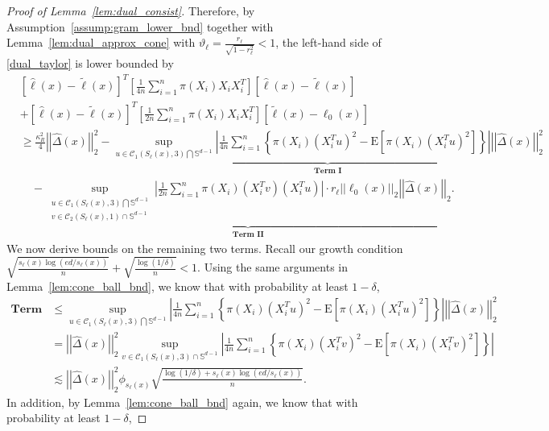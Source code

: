 \documentclass[ejsv2,noshowframe]{imsart}
\theoremstyle{plain}
\theoremstyle{definition}
\theoremstyle{remark}
\newcommand{\norm}[1]{\left|\left| #1 \right|\right|}
\renewcommand{\hat}{\widehat}
\renewcommand{\tilde}{\widetilde}
\begin{document}
\begin{proof}[Proof of Lemma~\ref{lem:dual_consist}]
	Therefore, by Assumption~\ref{assump:gram_lower_bnd} together with Lemma~\ref{lem:dual_approx_cone} with $\vartheta_{\ell} = \frac{r_{\ell}}{\sqrt{1-r_{\ell}^2}} < 1$, the left-hand side of \eqref{dual_taylor} is lower bounded by
	\begin{align*}
		&\left[\hat{\ell}(x) - \tilde{\ell}(x)\right]^T \left[\frac{1}{4n}\sum_{i=1}^n \pi(X_i) X_iX_i^T \right] \left[\hat{\ell}(x) - \tilde{\ell}(x)\right] \\
		&+ \left[\hat{\ell}(x) - \tilde{\ell}(x)\right]^T \left[\frac{1}{2n}\sum_{i=1}^n \pi(X_i) X_iX_i^T \right] \left[\tilde{\ell}(x) - \ell_0(x)\right]\\
		&\geq \frac{\kappa_R^2}{4} \norm{\hat{\Delta}(x)}_2^2 - \underbrace{\sup_{u \in \mathcal{C}_1(S_{\ell}(x),3)\bigcap \mathbb{S}^{d-1}} \left|\frac{1}{4n} \sum_{i=1}^n \left\{\pi(X_i) \left(X_i^T u\right)^2 - \mathrm{E}\left[\pi(X_i) \left(X_i^T u\right)^2\right]\right\} \right| \norm{\hat{\Delta}(x)}_2^2}_{\textbf{Term I}}\\
		&\quad -\underbrace{\sup_{\substack{u \in \mathcal{C}_1(S_{\ell}(x),3)\bigcap \mathbb{S}^{d-1} \\v\in \mathcal{C}_2(S_{\ell}(x), 1) \cap \mathbb{S}^{d-1}}} \left|\frac{1}{2n} \sum_{i=1}^n \pi(X_i) \left(X_i^T v\right) \left(X_i^T u\right) \right|\cdot r_{\ell}\norm{\ell_0(x)}_2\norm{\hat{\Delta}(x)}_2}_{\textbf{Term II}}.
	\end{align*}
	We now derive bounds on the remaining two terms. Recall our growth condition $\sqrt{\frac{s_{\ell}(x)\log(ed/s_{\ell}(x))}{n}} + \sqrt{\frac{\log(1/\delta)}{n}} < 1$. Using the same arguments in Lemma~\ref{lem:cone_ball_bnd}, we know that with probability at least $1-\delta$,
	\begin{align*}
		\textbf{Term I} &\leq \sup_{u \in \mathcal{C}_1(S_{\ell}(x),3)\bigcap \mathbb{S}^{d-1}} \left|\frac{1}{4n} \sum_{i=1}^n \left\{\pi(X_i) \left(X_i^T u\right)^2 - \mathrm{E}\left[\pi(X_i) \left(X_i^T u\right)^2\right]\right\} \right| \norm{\hat{\Delta}(x)}_2^2 \\
		&= \norm{\hat{\Delta}(x)}_2^2\sup_{v \in \mathcal{C}_1(S_{\ell}(x),3) \cap \mathbb{S}^{d-1}} \left|\frac{1}{4n} \sum_{i=1}^n \left\{\pi(X_i) \left(X_i^T v\right)^2 - \mathrm{E}\left[\pi(X_i) \left(X_i^Tv\right)^2\right]\right\} \right| \\
		&\lesssim \norm{\hat{\Delta}(x)}_2^2 \phi_{s_{\ell}(x)} \sqrt{\frac{\log(1/\delta)+s_{\ell}(x)\log(ed/s_{\ell}(x))}{n}}.
	\end{align*}
	In addition, by Lemma~\ref{lem:cone_ball_bnd} again, we know that with probability at least $1-\delta$,

\end{proof}
\end{document}
